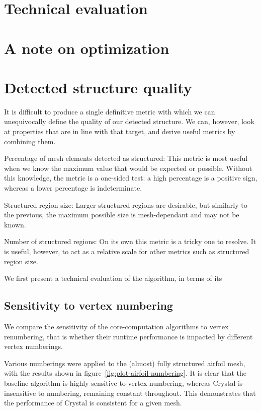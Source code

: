 \section{Technical evaluation}

\section{A note on optimization}



\section{Detected structure quality}
It is difficult to produce a single definitive metric with which we can unequivocally define the quality of our detected structure. We can, however, look at properties that are in line with that target, and derive useful metrics by combining them.

Percentage of mesh elements detected as structured:
This metric is most useful when we know the maximum value that would be expected or possible.
Without this knowledge, the metric is a one-sided test: a high percentage is a positive sign, whereas a lower percentage is indeterminate.

Structured region size:
Larger structured regions are desirable, but similarly to the previous, the maximum possible size is mesh-dependant and may not be known.

Number of structured regions:
On its own this metric is a tricky one to resolve. It is useful, however, to act as a relative scale for other metrics such as structured region size.





We first present a technical evaluation of the algorithm, in terms of its


\subsection{Sensitivity to vertex numbering}
We compare the sensitivity of the core-computation algorithms to vertex renumbering, that is whether their runtime performance is impacted by different vertex numberings.

Various numberings were applied to the (almost) fully structured airfoil mesh, with the results shown in figure~\ref{fig:plot-airfoil-numbering}. It is clear that the baseline algorithm is highly sensitive to vertex numbering, whereas Crystal is insensitive to numbering, remaining constant throughout. This demonstrates that the performance of Crystal is consistent for a given mesh.

